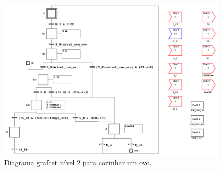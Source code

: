 \begin{figure}[!h]
\centering
\includegraphics[width=\textwidth]{figuras/ovoNivel2}
\caption{Diagrama grafcet nível 2 para cozinhar um ovo.}
\label{fig:grafcetOvo2}
\end{figure}

